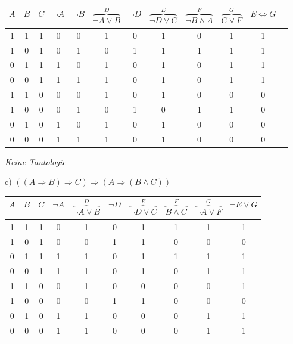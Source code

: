 \begin{table}[h]
\centering
\begin{tabular}{c|c|c|c|c|c|c|c|c|c|c|c}
$A$ & $B$ & $C$ & $\lnot A$ & $\lnot B$ & $\overbrace{\lnot A \lor B}^{D}$ & $\lnot D$ & $\overbrace{\lnot D \lor C}^{E}$ & $\overbrace{\lnot B \land A}^{F}$ & $\overbrace{C \lor F}^{G}$ & $E \Leftrightarrow G$\\
\hline
1 & 1 & 1 & 0 & 0 & 1 & 0 & 1 & 0 & 1 & 1\\
1 & 0 & 1 & 0 & 1 & 0 & 1 & 1 & 1 & 1 & 1\\
0 & 1 & 1 & 1 & 0 & 1 & 0 & 1 & 0 & 1 & 1\\
0 & 0 & 1 & 1 & 1 & 1 & 0 & 1 & 0 & 1 & 1\\
1 & 1 & 0 & 0 & 0 & 1 & 0 & 1 & 0 & 0 & 0\\
1 & 0 & 0 & 0 & 1 & 0 & 1 & 0 & 1 & 1 & 0\\
0 & 1 & 0 & 1 & 0 & 1 & 0 & 1 & 0 & 0 & 0\\
0 & 0 & 0 & 1 & 1 & 1 & 0 & 1 & 0 & 0 & 0\\
\end{tabular}
\end{table}

\textit{Keine Tautologie}\\

\newpage

c) $((A \Rightarrow B) \Rightarrow C) \Rightarrow (A \Rightarrow (B \land C))$\\

\begin{table}[h]
\centering
\begin{tabular}{c|c|c|c|c|c|c|c|c|c}
$A$ & $B$ & $C$ & $\lnot A$ & $\overbrace{\lnot A \lor B}^{D}$ & $\lnot D$ & $\overbrace{\lnot D \lor C}^{E}$ & $\overbrace{B \land C}^{F}$ & $\overbrace{\lnot A \lor F}^{G}$ & $\lnot E \lor G$\\
\hline
1 & 1 & 1 & 0 & 1 & 0 & 1 & 1 & 1 & 1\\
1 & 0 & 1 & 0 & 0 & 1 & 1 & 0 & 0 & 0\\
0 & 1 & 1 & 1 & 1 & 0 & 1 & 1 & 1 & 1\\
0 & 0 & 1 & 1 & 1 & 0 & 1 & 0 & 1 & 1\\
1 & 1 & 0 & 0 & 1 & 0 & 0 & 0 & 0 & 1\\
1 & 0 & 0 & 0 & 0 & 1 & 1 & 0 & 0 & 0\\
0 & 1 & 0 & 1 & 1 & 0 & 0 & 0 & 1 & 1\\
0 & 0 & 0 & 1 & 1 & 0 & 0 & 0 & 1 & 1\\
\end{tabular}
\end{table}

